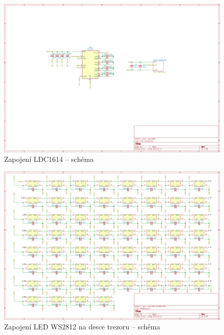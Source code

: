 \begin{figure}
    \centering
    \includegraphics[width=0.93\textheight, angle=90]{kapitoly/ctvrta_elektronicka_varianta/E4_zapojeni/next_board.png}
    \caption{Zapojení LDC1614 -- schéma}
    \label{fig:E4-sch_next-board}
\end{figure}
\begin{figure}
    \centering
    \includegraphics[width=0.93\textheight, angle=90]{kapitoly/ctvrta_elektronicka_varianta/E4_zapojeni/WS2812.png}
    \caption{Zapojení LED WS2812 na desce trezoru -- schéma}
    \label{fig:E4-sch_WS2812}
\end{figure}